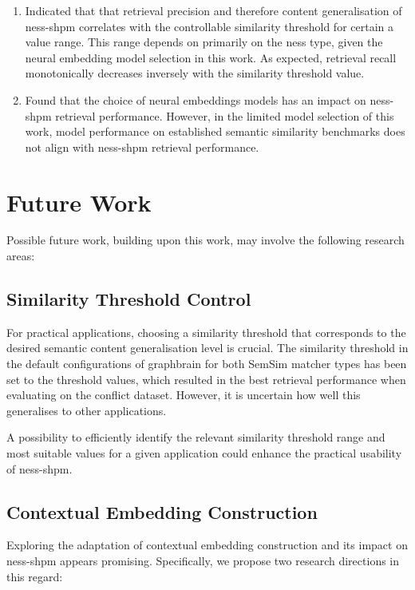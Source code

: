 \documentclass[11pt, numbers=noenddot]{scrreprt}
\begin{document}
\begin{enumerate}[label=\textbf{C.\arabic*}, leftmargin=0pt, labelwidth=*, align=left, labelsep=0.5em, itemindent=0pt, listparindent=\parindent]
\item Indicated that that retrieval precision and therefore content generalisation of \gls{ness-shpm} correlates with the controllable similarity threshold for certain a value range. This range depends on primarily on the \gls{ness} type, given the neural embedding model selection in this work. 
As expected, retrieval recall monotonically decreases inversely with the similarity threshold value.

\item Found that the choice of neural embeddings models has an impact on \gls{ness-shpm} retrieval performance. However, in the limited model selection of this  work, model performance on established semantic similarity benchmarks does not align with \gls{ness-shpm} retrieval performance.

\end{enumerate}


\section*{Future Work}
Possible future work, building upon this work, may involve the following research areas:

\subsection*{Similarity Threshold Control}
For practical applications, choosing a similarity threshold that corresponds to the desired semantic content generalisation level is crucial. The similarity threshold in the default configurations of graphbrain for both SemSim matcher types has been set to the threshold values, which resulted in the best retrieval performance when evaluating on the conflict dataset. However, it is uncertain how well this generalises to other applications.

A possibility to efficiently identify the relevant similarity threshold range and most suitable values for a given application could enhance the practical usability of \gls{ness-shpm}.

%


\subsection*{Contextual Embedding Construction}
Exploring the adaptation of contextual embedding construction and its impact on \gls{ness-shpm} appears promising. Specifically, we propose two research directions in this regard:
\end{document}
